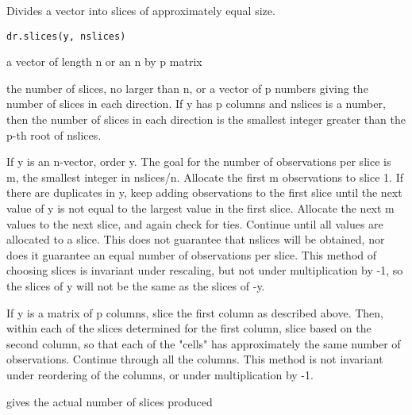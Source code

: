 \begin{Description}\relax
Divides a vector into slices of approximately equal size.
\end{Description}
\begin{Usage}
\begin{verbatim}
dr.slices(y, nslices)
\end{verbatim}
\end{Usage}
\begin{Arguments}
\begin{ldescription}
\item[\code{y}] a vector of length n or an n by p matrix
\item[\code{nslices}] the number of slices, no larger than n, or a vector of
p numbers giving the number of slices in each direction.  If y has p 
columns and nslices is a number, then the number of slices in each direction
is the smallest integer greater than the p-th root of nslices.
\end{ldescription}
\end{Arguments}
\begin{Details}\relax
If y is an n-vector, order y.  The goal for the number of observations per slice
is m, the smallest integer in nslices/n. Allocate the first m observations to
slice 1.  If there are duplicates in y, keep adding observations to the first
slice until the next value of y is not equal to the largest value in the 
first slice.  Allocate the next m values to the next slice, and again check 
for ties.  Continue until all values are allocated to a slice.  This does not
guarantee that nslices will be obtained, nor does it guarantee an equal number
of observations per slice.  This method of choosing slices is invariant under
rescaling, but not under multiplication by -1, so the slices of y will not
be the same as the slices of -y.

If y is a matrix of p columns, slice the first column as described above.  Then,
within each of the slices determined for the first column, slice based on the
second column, so that each of the "cells" has approximately the same number
of observations.  Continue through all the columns.  This method is not
invariant under reordering of the columns, or under multiplication by -1.
\end{Details}
\begin{Value}
\begin{ldescription}
\item[\code{slice.sizes}] 
\item[\code{slice.indicator}] 
\item[\code{nslices}] 
\end{ldescription}
 {gives the actual number of slices produced}
\end{Value}
